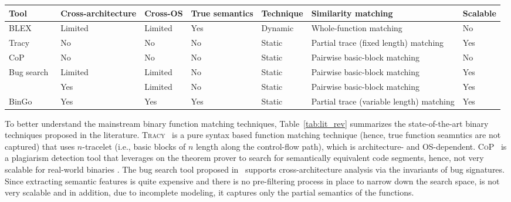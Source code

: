 \begin{table*}[t]
\scriptsize
	\begin{center}
\caption{Comparison of existing techniques} \label{tab:lit_rev}
\begin{tabular}{ | m{2.1cm} | m{2cm} | m{1.3cm} | m{2.5cm} | m{1.2cm} | m{4cm} | m{1.0cm}| }
\hline
	\textbf{Tool} & \textbf{Cross-architecture} & \textbf{Cross-OS} & \textbf{True semantics} & \textbf{Technique} & \textbf{Similarity matching} & \textbf{Scalable} \\ \hline
	 BLEX~\cite{egele2014blanket} & Limited & Limited & Yes & Dynamic & Whole-function matching & No \\ \hline
	 Tracy~\cite{DBLP:conf/pldi/DavidY14} & No & No & No & Static & Partial trace (fixed length) matching & Yes \\ \hline
     CoP~\cite{luo2014semantics} & No & No & No & Static & Pairwise basic-block matching& No \\ \hline
	Bug search~\cite{DBLP:conf/sp/PewnyGGRH15} & Limited & Limited & No & Static & Pairwise basic-block matching & Yes \\ \hline
	\mahin{discovRE}~\cite{DBLP:conf/sp/PewnyGGRH15} & Yes & Limited & No & Static & Pairwise basic-block matching & Yes \\ \hline
	 BinGo & Yes & Yes & Yes & Static & Partial trace (variable length) matching & Yes \\ \hline
\end{tabular}
\end{center} \vspace{-5mm}
\end{table*}

To better understand the mainstream binary function matching techniques, Table~\ref{tab:lit_rev} summarizes the state-of-the-art binary techniques proposed in the literature. \textsc{\small Tracy}~\cite{DBLP:conf/pldi/DavidY14} is a pure syntax based function matching technique (hence, true function seamntics are not captured) that uses $n$-tracelet (i.e., basic blocks of $n$ length along the control-flow path), which is architecture- and OS-dependent. \textsc{\small CoP}~\cite{luo2014semantics} is a plagiarism detection tool that leverages on the theorem prover to search for semantically equivalent code segments, hence, not very scalable for real-world binaries .  The bug search tool proposed in~\cite{DBLP:conf/sp/PewnyGGRH15} supports cross-architecture analysis via the invariants of bug signatures. 
Since extracting semantic features is quite expensive and there is no pre-filtering process in place to narrow down the search space,  \cite{DBLP:conf/sp/PewnyGGRH15} is not very scalable and in addition, due to incomplete modeling, it captures only the partial semantics of the functions.


